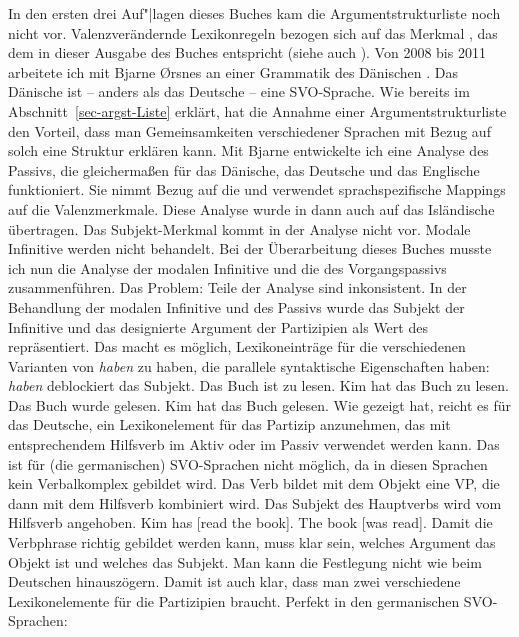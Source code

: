 {In den ersten drei Auf"|lagen dieses Buches kam die Argumentstrukturliste noch nicht
vor. Valenzverändernde Lexikonregeln bezogen sich auf das Merkmal \subcat, das dem \compsm in dieser
Ausgabe des Buches entspricht (siehe auch \citealt{Mueller2003e}). Von 2008 bis 2011 arbeitete ich mit Bjarne Ørsnes an einer Grammatik
des Dänischen \citep{MOeDanish}. Das Dänische ist -- anders als das Deutsche -- eine SVO-Sprache. Wie bereits im
Abschnitt~\ref{sec-argst-Liste} erklärt, hat die Annahme einer Argumentstrukturliste den Vorteil, dass man
Gemeinsamkeiten verschiedener Sprachen mit Bezug auf solch eine Struktur erklären kann. Mit Bjarne
entwickelte ich eine Analyse des Passivs, die gleichermaßen für das Dänische, das Deutsche und das
Englische funktioniert. Sie nimmt Bezug auf die \argstl und verwendet sprachspezifische Mappings auf
die Valenzmerkmale. Diese Analyse wurde in  dann auch auf das Isländische
übertragen. Das Subjekt-Merkmal kommt in der Analyse nicht vor. Modale Infinitive werden
nicht behandelt. Bei der Überarbeitung dieses Buches musste ich nun die Analyse der modalen
Infinitive und die des Vorgangspassivs zusammenführen. Das Problem: Teile der Analyse sind
inkonsistent. In der Behandlung der modalen Infinitive und des Passivs wurde das Subjekt der
Infinitive und das designierte Argument der Partizipien als Wert des \subjms repräsentiert. Das
macht es möglich, Lexikoneinträge für die verschiedenen Varianten von \emph{haben} zu haben, die parallele syntaktische
Eigenschaften haben: \emph{haben} deblockiert das Subjekt.
\eal
\ex Das Buch ist zu lesen.
\ex Kim hat das Buch zu lesen.
\ex Das Buch wurde gelesen.
\ex Kim hat das Buch gelesen.
\zl
Wie \citet{Haider86} gezeigt hat, reicht es für das Deutsche, ein Lexikonelement für das Partizip
anzunehmen, das mit entsprechendem Hilfsverb im Aktiv oder im Passiv verwendet werden kann. Das ist
für (die germanischen) SVO-Sprachen nicht möglich, da in diesen Sprachen kein Verbalkomplex gebildet
wird. Das Verb bildet mit dem Objekt eine VP, die dann mit dem Hilfsverb kombiniert wird. Das
Subjekt des Hauptverbs wird vom Hilfsverb angehoben.
\eal
\ex Kim has [read the book].
\ex The book [was read].
\zl 
Damit die Verbphrase richtig gebildet werden kann, muss klar sein, welches Argument das Objekt ist
und welches das Subjekt. Man kann die Festlegung nicht wie beim Deutschen hinauszögern. Damit ist
auch klar, dass man zwei verschiedene Lexikonelemente für die Partizipien braucht.
\eal
\ex Perfekt in den germanischen SVO-Sprachen:\\
}
